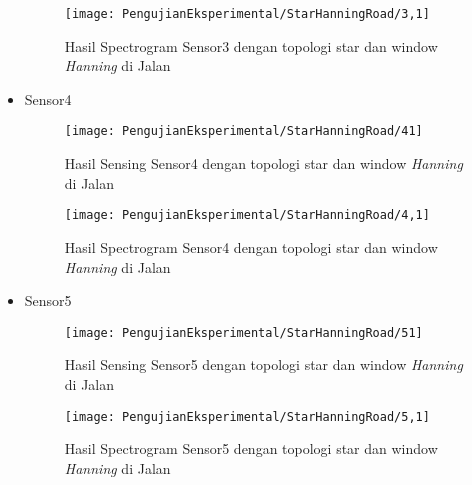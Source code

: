 \begin{itemize}
\begin{figure}[H]
	\centering
	\texttt{[image: PengujianEksperimental/StarHanningRoad/3,1]}
	\caption[Hasil Spectrogram Sensor3 dengan topologi star dan window {\it Hanning} di Jalan]{Hasil Spectrogram Sensor3 dengan topologi star dan window {\it Hanning} di Jalan} 
	\label{fig:hasilJalanStarHann3,1}
\end{figure}

\item Sensor4
\begin{figure}[H]
	\centering
	\texttt{[image: PengujianEksperimental/StarHanningRoad/41]}
	\caption[Hasil Sensing Sensor4 dengan topologi star dan window {\it Hanning} di Jalan]{Hasil Sensing Sensor4 dengan topologi star dan window {\it Hanning} di Jalan} 
	\label{fig:hasilJalanStarHann41}
\end{figure}

\begin{figure}[H]
	\centering
	\texttt{[image: PengujianEksperimental/StarHanningRoad/4,1]}
	\caption[Hasil Spectrogram Sensor4 dengan topologi star dan window {\it Hanning} di Jalan]{Hasil Spectrogram Sensor4 dengan topologi star dan window {\it Hanning} di Jalan} 
	\label{fig:hasilJalanStarHann4,1}
\end{figure}

\item Sensor5
\begin{figure}[H]
	\centering
	\texttt{[image: PengujianEksperimental/StarHanningRoad/51]}
	\caption[Hasil Sensing Sensor5 dengan topologi star dan window {\it Hanning} di Jalan]{Hasil Sensing Sensor5 dengan topologi star dan window {\it Hanning} di Jalan} 
	\label{fig:hasilJalanStarHann51}
\end{figure}

\begin{figure}[H]
	\centering
	\texttt{[image: PengujianEksperimental/StarHanningRoad/5,1]}
	\caption[Hasil Spectrogram Sensor5 dengan topologi star dan window {\it Hanning} di Jalan]{Hasil Spectrogram Sensor5 dengan topologi star dan window {\it Hanning} di Jalan} 
	\label{fig:hasilJalanStarHann5,1}
\end{figure}
\end{itemize}

